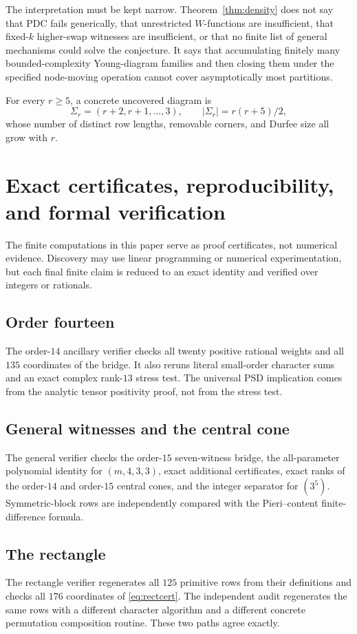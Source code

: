 \documentclass[11pt]{article}
\theoremstyle{definition}
\begin{document}
The interpretation must be kept narrow.  Theorem~\ref{thm:density} does not say that PDC fails generically, that unrestricted $W$-functions are insufficient, that fixed-$k$ higher-swap witnesses are insufficient, or that no finite list of general mechanisms could solve the conjecture.  It says that accumulating finitely many bounded-complexity Young-diagram families and then closing them under the specified node-moving operation cannot cover asymptotically most partitions.

For every $r\ge5$, a concrete uncovered diagram is
\[
 \Sigma_r=(r+2,r+1,\dots,3),\qquad |\Sigma_r|=r(r+5)/2,
\]
whose number of distinct row lengths, removable corners, and Durfee size all grow with $r$.

\section{Exact certificates, reproducibility, and formal verification}\label{sec:verification}
The finite computations in this paper serve as proof certificates, not numerical evidence.  Discovery may use linear programming or numerical experimentation, but each final finite claim is reduced to an exact identity and verified over integers or rationals.

\subsection{Order fourteen}
The order-$14$ ancillary verifier checks all twenty positive rational weights and all $135$ coordinates of the bridge.  It also reruns literal small-order character sums and an exact complex rank-$13$ stress test.  The universal PSD implication comes from the analytic tensor positivity proof, not from the stress test.

\subsection{General witnesses and the central cone}
The general verifier checks the order-$15$ seven-witness bridge, the all-parameter polynomial identity for $(m,4,3,3)$, exact additional certificates, exact ranks of the order-$14$ and order-$15$ central cones, and the integer separator for $(3^5)$.  Symmetric-block rows are independently compared with the Pieri--content finite-difference formula.

\subsection{The rectangle}
The rectangle verifier regenerates all $125$ primitive rows from their definitions and checks all $176$ coordinates of \eqref{eq:rectcert}.  The independent audit regenerates the same rows with a different character algorithm and a different concrete permutation composition routine.  These two paths agree exactly.
\end{document}
